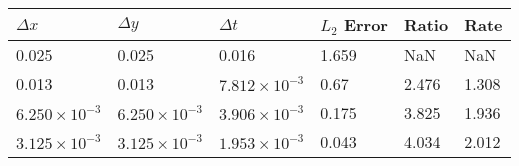\begin{tabular}{|l|l|l|l|l|l|}
\hline
\textbf{$\Delta x$}&\textbf{$\Delta y$}&\textbf{$\Delta t$}&\textbf{$L_2$ Error}&\textbf{Ratio}&\textbf{Rate}\\\hline
0.025&0.025&0.016&1.659&NaN&NaN\\\hline
0.013&0.013&$7.812 \times 10^{-3}$&0.67&2.476&1.308\\\hline
$6.250 \times 10^{-3}$&$6.250 \times 10^{-3}$&$3.906 \times 10^{-3}$&0.175&3.825&1.936\\\hline
$3.125 \times 10^{-3}$&$3.125 \times 10^{-3}$&$1.953 \times 10^{-3}$&0.043&4.034&2.012\\\hline
\end{tabular}
